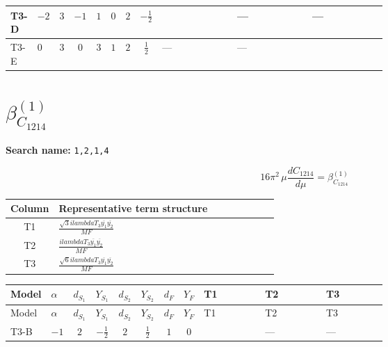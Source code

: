 \documentclass[8pt]{article}
\begin{document}
\begin{landscape}
\begin{longtable}{@{}llcccccc >{\raggedright\arraybackslash}p{0.21\linewidth} >{\raggedright\arraybackslash}p{0.21\linewidth} >{\raggedright\arraybackslash}p{0.21\linewidth}@{}}
\midrule
T3-D & $-2$ & $3$ & $-1$ & $1$ & $0$ & $2$ & $-\frac{1}{2}$ & \scriptsize\adjustbox{max width=\linewidth}{$\begin{gathered} - \frac{\sqrt{3} lambdaT_{3} \overline{y_{1}} \overline{y_{2}}}{3 MF}\end{gathered}$} & --- & --- \\
\midrule
T3-E & $0$ & $3$ & $0$ & $3$ & $1$ & $2$ & $\frac{1}{2}$ & --- & --- & \scriptsize\adjustbox{max width=\linewidth}{$\begin{gathered} \frac{\sqrt{6} lambdaT_{3} \overline{y_{1}} \overline{y_{2}}}{3 MF}\end{gathered}$} \\
\midrule
\bottomrule
\end{longtable}
\clearpage
\section*{$\beta_{C_{1214}}^{(1)}$}
\noindent\textbf{Search name: }\texttt{1,2,1,4}\par\smallskip
\[16\pi^2\,\mu\frac{d C_{1214}}{d\mu}=\beta_{C_{1214}}^{(1)}\]
\begin{center}
\begin{tabular}{@{}c >{\raggedright\arraybackslash}p{0.82\linewidth}@{}}
\toprule
Column & Representative term structure \\
\midrule
T1 & \(\displaystyle \frac{\sqrt{3} i lambdaT_{3} \overline{y_{1}} \overline{y_{2}}}{MF}\) \\
\midrule
T2 & \(\displaystyle \frac{i lambdaT_{3} \overline{y_{1}} \overline{y_{2}}}{MF}\) \\
\midrule
T3 & \(\displaystyle \frac{\sqrt{6} i lambdaT_{3} \overline{y_{1}} \overline{y_{2}}}{MF}\) \\
\midrule
\bottomrule
\end{tabular}
\end{center}
\smallskip
\tiny
\begin{longtable}{@{}llcccccc >{\raggedright\arraybackslash}p{0.21\linewidth} >{\raggedright\arraybackslash}p{0.21\linewidth} >{\raggedright\arraybackslash}p{0.21\linewidth}@{}}
\toprule
Model & $\alpha$ & $d_{S_1}$ & $Y_{S_1}$ & $d_{S_2}$ & $Y_{S_2}$ & $d_F$ & $Y_F$ & T1 & T2 & T3 \\
\midrule
\endfirsthead
\toprule
Model & $\alpha$ & $d_{S_1}$ & $Y_{S_1}$ & $d_{S_2}$ & $Y_{S_2}$ & $d_F$ & $Y_F$ & T1 & T2 & T3 \\
\midrule
\endhead
T3-B & $-1$ & $2$ & $-\frac{1}{2}$ & $2$ & $\frac{1}{2}$ & $1$ & $0$ & \scriptsize\adjustbox{max width=\linewidth}{$\begin{gathered} - \frac{\sqrt{3} i lambdaT_{3} \overline{y_{1}} \overline{y_{2}}}{3 MF}\end{gathered}$} & --- & --- \\

\end{longtable}
\end{landscape}
\end{document}
